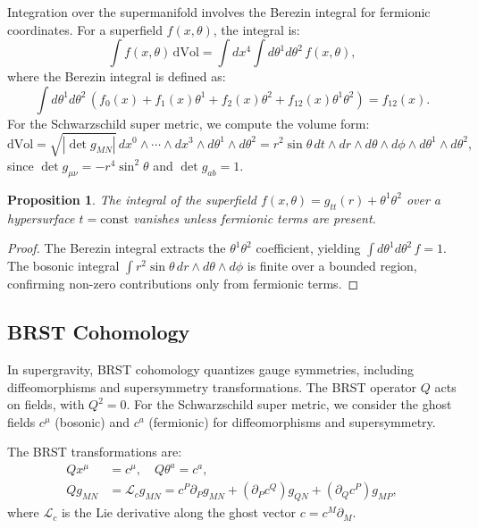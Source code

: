\documentclass{article}
\theoremstyle{plain}
\newtheorem{proposition}{Proposition}
\newcommand{\lie}[1]{\mathcal{L}_{#1}}
\newcommand{\dvol}{\mathrm{dVol}}
\begin{document}
Integration over the supermanifold involves the Berezin integral for fermionic coordinates. For a superfield $f(x, \theta)$, the integral is:
\begin{equation}
\int f(x, \theta) \, \dvol = \int dx^{4} \int d\theta^{1} d\theta^{2} \, f(x, \theta),
\end{equation}
where the Berezin integral is defined as:
\begin{equation}
\int d\theta^{1} d\theta^{2} \, (f_{0}(x) + f_{1}(x) \theta^{1} + f_{2}(x) \theta^{2} + f_{12}(x) \theta^{1} \theta^{2}) = f_{12}(x).
\end{equation}
For the Schwarzschild super metric, we compute the volume form:
\begin{equation}
\dvol = \sqrt{|\det g_{MN}|} \, dx^{0} \wedge \cdots \wedge dx^{3} \wedge d\theta^{1} \wedge d\theta^{2} = r^{2} \sin\theta \, dt \wedge dr \wedge d\theta \wedge d\phi \wedge d\theta^{1} \wedge d\theta^{2},
\end{equation}
since $\det g_{\mu\nu} = -r^{4} \sin^{2}\theta$ and $\det g_{ab} = 1$.

\begin{proposition}
The integral of the superfield $f(x, \theta) = g_{tt}(r) + \theta^{1} \theta^{2}$ over a hypersurface $t = \text{const}$ vanishes unless fermionic terms are present.
\end{proposition}

\begin{proof}
The Berezin integral extracts the $\theta^{1} \theta^{2}$ coefficient, yielding $\int d\theta^{1} d\theta^{2} \, f = 1$. The bosonic integral $\int r^{2} \sin\theta \, dr \wedge d\theta \wedge d\phi$ is finite over a bounded region, confirming non-zero contributions only from fermionic terms.
\end{proof}

\subsection{BRST Cohomology}

In supergravity, BRST cohomology quantizes gauge symmetries, including diffeomorphisms and supersymmetry transformations. The BRST operator $Q$ acts on fields, with $Q^{2} = 0$. For the Schwarzschild super metric, we consider the ghost fields $c^{\mu}$ (bosonic) and $c^{a}$ (fermionic) for diffeomorphisms and supersymmetry.

The BRST transformations are:
\begin{align}
Q x^{\mu} &= c^{\mu}, \quad Q \theta^{a} = c^{a}, \\
Q g_{MN} &= \lie{c} g_{MN} = c^{P} \partial_{P} g_{MN} + (\partial_{P} c^{Q}) g_{QN} + (\partial_{Q} c^{P}) g_{MP},
\end{align}
where $\lie{c}$ is the Lie derivative along the ghost vector $c = c^{M} \partial_{M}$.
\end{document}
